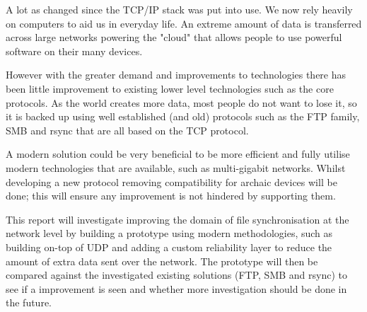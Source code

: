 A lot as changed since the TCP/IP stack was put into use. We now rely heavily on computers to aid us in everyday life. An extreme amount of data is transferred across large networks powering the "cloud" that allows people to use powerful software on their many devices.

However with the greater demand and improvements to technologies there has been little improvement to existing lower level technologies such as the core protocols. As the world creates more data, most people do not want to lose it, so it is backed up using well established (and old) protocols such as the FTP family, SMB and rsync that are all based on the TCP protocol.

A modern solution could be very beneficial to be more efficient and fully utilise modern technologies that are available, such as multi-gigabit networks. Whilst developing a new protocol removing compatibility for archaic devices will be done; this will ensure any improvement is not hindered by supporting them.

This report will investigate improving the domain of file synchronisation at the network level by building a prototype using modern methodologies, such as building on-top of UDP and adding a custom reliability layer to reduce the amount of extra data sent over the network. The prototype will then be compared against the investigated existing solutions (FTP, SMB and rsync) to see if a improvement is seen and whether more investigation should be done in the future.
